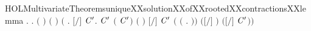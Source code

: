 \newcommand{\HOLMultivariateTheoremsuniqueXXsolutionXXofXXrootedXXcontractions}{\UseVerbatim{HOLMultivariateTheoremsuniqueXXsolutionXXofXXrootedXXcontractions}}
\begin{SaveVerbatim}{HOLMultivariateTheoremsuniqueXXsolutionXXofXXrootedXXcontractionsXXlemma}
\HOLTokenTurnstile{} \HOLSymConst{\HOLTokenForall{}}   .
          \HOLSymConst{\HOLTokenConj{}}    \HOLSymConst{\HOLTokenConj{}}
            \HOLSymConst{\HOLTokenConj{}}
            \HOLSymConst{\HOLTokenImp{}}
       \HOLSymConst{\HOLTokenForall{}}.
              \HOLSymConst{\HOLTokenConj{}}  \ensuremath{(} \ensuremath{)} \ensuremath{(} \ensuremath{)} \HOLSymConst{\HOLTokenImp{}}
           \ensuremath{(}\HOLSymConst{\HOLTokenForall{}} .
                \ensuremath{[}\ensuremath{/}\ensuremath{]}  \HOLTokenWeakTransBegin{} \HOLTokenWeakTransEnd {} \HOLSymConst{\HOLTokenImp{}}
                \HOLSymConst{\HOLTokenExists{}}\ensuremath{\HOLBoundVar{C}\sp{\prime}}.
                      \ensuremath{\HOLBoundVar{C}\sp{\prime}} \HOLSymConst{\HOLTokenConj{}}  \ensuremath{(} \ensuremath{\HOLBoundVar{C}\sp{\prime}}\ensuremath{)} \ensuremath{(} \ensuremath{)} \HOLSymConst{\HOLTokenConj{}}
                      \ensuremath{[}\ensuremath{/}\ensuremath{]} \ensuremath{\HOLBoundVar{C}\sp{\prime}} \HOLSymConst{\HOLTokenConj{}}
                    \ensuremath{(}  \ensuremath{(}\HOLTokenLambda{} .  \HOLTokenWeakTransBegin{} \HOLTokenWeakTransEnd {}\ensuremath{)}\ensuremath{)}
                      \ensuremath{(}\ensuremath{[}\ensuremath{/}\ensuremath{]} \ensuremath{)} \ensuremath{(}\ensuremath{[}\ensuremath{/}\ensuremath{]} \ensuremath{\HOLBoundVar{C}\sp{\prime}}\ensuremath{)}\ensuremath{)} \HOLSymConst{\HOLTokenConj{}}

\end{SaveVerbatim}
